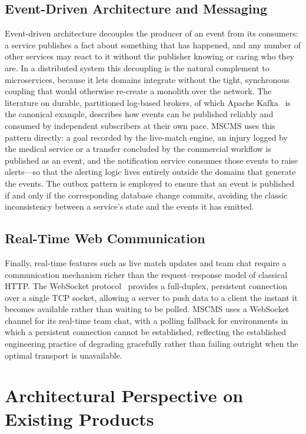 \subsection{Event-Driven Architecture and Messaging}
\label{subsec:lit-eda}

Event-driven architecture decouples the producer of an event from its consumers: a service
publishes a fact about something that has happened, and any number of other services may
react to it without the publisher knowing or caring who they are. In a distributed system this
decoupling is the natural complement to microservices, because it lets domains integrate
without the tight, synchronous coupling that would otherwise re-create a monolith over the
network. The literature on durable, partitioned log-based brokers, of which Apache
Kafka~\cite{kafka} is the canonical example, describes how events can be published reliably
and consumed by independent subscribers at their own pace. MSCMS uses this pattern
directly: a goal recorded by the live-match engine, an injury logged by the medical service or
a transfer concluded by the commercial workflow is published as an event, and the
notification service consumes those events to raise alerts---so that the alerting logic lives
entirely outside the domains that generate the events. The outbox pattern is employed to
ensure that an event is published if and only if the corresponding database change commits,
avoiding the classic inconsistency between a service's state and the events it has emitted.

\subsection{Real-Time Web Communication}
\label{subsec:lit-rt}

Finally, real-time features such as live match updates and team chat require a communication
mechanism richer than the request--response model of classical HTTP. The WebSocket
protocol~\cite{websocket} provides a full-duplex, persistent connection over a single TCP
socket, allowing a server to push data to a client the instant it becomes available rather
than waiting to be polled. MSCMS uses a WebSocket channel for its real-time team chat,
with a polling fallback for environments in which a persistent connection cannot be
established, reflecting the established engineering practice of degrading gracefully rather
than failing outright when the optimal transport is unavailable.

\section{Architectural Perspective on Existing Products}
\label{sec:lit-arch}

